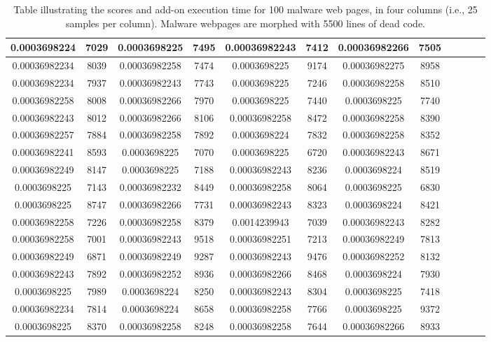 \begin{table}[h]
\begin{tabular}{|c|c|c|c|c|c|c|c|c|c|c|c|}
\midrule
0.0003698224&7029&0.0003698225&7495&0.00036982243&7412&0.00036982266&7505\\
\midrule
0.00036982234&8039&0.00036982258&7474&0.0003698225&9174&0.00036982275&8958\\
\midrule
0.00036982234&7937&0.00036982243&7743&0.0003698225&7246&0.00036982258&8510\\
\midrule
0.00036982258&8008&0.00036982266&7970&0.0003698225&7440&0.0003698225&7740\\
\midrule
0.00036982243&8012&0.00036982266&8106&0.00036982258&8472&0.00036982258&8390\\
\midrule
0.00036982257&7884&0.00036982258&7892&0.0003698224&7832&0.00036982258&8352\\
\midrule
0.00036982241&8593&0.0003698225&7070&0.0003698225&6720&0.00036982243&8671\\
\midrule
0.00036982249&8147&0.0003698225&7188&0.00036982243&8236&0.0003698224&8519\\
\midrule
0.0003698225&7143&0.00036982232&8449&0.00036982258&8064&0.0003698225&6830\\
\midrule
0.0003698225&8747&0.00036982266&7731&0.00036982243&8323&0.0003698224&8421\\
\midrule
0.00036982258&7226&0.00036982258&8379&0.0014239943&7039&0.00036982243&8282\\
\midrule
0.00036982258&7001&0.00036982243&9518&0.00036982251&7213&0.00036982249&7813\\
\midrule
0.00036982249&6871&0.00036982249&9287&0.00036982243&9476&0.00036982252&8132\\
\midrule
0.00036982243&7892&0.00036982252&8936&0.00036982266&8468&0.0003698224&7930\\
\midrule
0.0003698225&7989&0.0003698224&8250&0.00036982243&8304&0.0003698225&7418\\
\midrule
0.00036982234&7814&0.0003698224&8658&0.00036982258&7766&0.0003698225&9372\\
\midrule
0.0003698225&8370&0.00036982258&8248&0.00036982258&7644&0.00036982266&8933\\
\midrule
\end{tabular}
\caption[Scores table of malware web pages]{Table illustrating the scores and add-on execution time for 100 malware web pages, in four columns (i.e., 25 samples per column). Malware webpages are morphed with 5500 lines of dead code. } \label{tab:m5500table}
\end{table}

